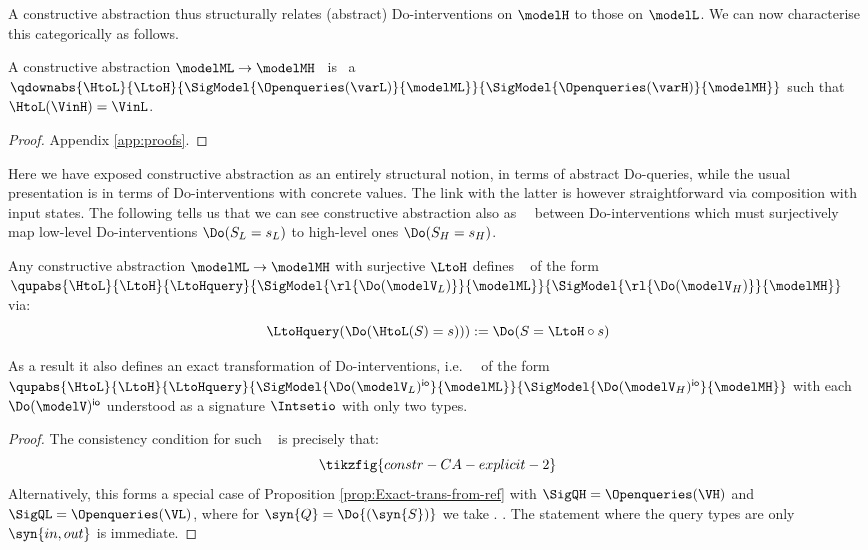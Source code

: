 \documentclass{article}
\begin{document}
A constructive abstraction thus structurally relates (abstract) Do-interventions on $\modelH$ to those on $\modelL$. We can now characterise this categorically as follows.


\begin{theorem} \label{Thm:CCA-as-refinement}
A constructive abstraction $\modelML \to \modelMH$ 
\ is \ 
a \qdown{} $\qdownabs{\HtoL}{\LtoH}{\SigModel{\Openqueries(\varL)}{\modelML}}{\SigModel{\Openqueries(\varH)}{\modelMH}}$ 
such that $\HtoL(\VinH) = \VinL$. 
\end{theorem}
\begin{proof}
Appendix \ref{app:proofs}.
\end{proof}

Here we have exposed constructive abstraction as an entirely structural notion, in terms of abstract Do-queries, while the usual presentation is in terms of Do-interventions with concrete values. The link with the latter is however  straightforward via composition with input states. 
The following tells us that we can see constructive abstraction also as \rlc{an}\ \qup\ between Do-interventions 
which must surjectively map low-level Do-interventions $\Do(S_L=s_L)$ to high-level ones $\Do(S_H=s_H)$.  


\begin{corollary} \label{cor:CCA-as-qup}
Any constructive abstraction 
$\modelML \to \modelMH$
with surjective $\LtoH$ 
defines \ \qup{}
of the form 
$\qupabs{\HtoL}{\LtoH}{\LtoHquery}{\SigModel{\rl{\Do(\modelV_L)}}{\modelML}}{\SigModel{\rl{\Do(\modelV_H)}}{\modelMH}}$ 
via: 
\[
\LtoHquery(\Do(\HtoL(S)=s))) := \Do(S=\LtoH \circ s) 
\]
\end{corollary}

As a result it also defines an exact transformation of Do-interventions, i.e.~\ \qup{} of the form 
${\qupabs{\HtoL}{\LtoH}{\LtoHquery}
{\SigModel{\Do(\modelV_L)^{\mathsf{io}}}{\modelML}}
{\SigModel{\Do(\modelV_H)^{\mathsf{io}}}{\modelMH}}}$ with each $\Do(\modelV)^{\mathsf{io}}$ understood as a signature $\Intsetio$ with only two types. 
\rlc{In fact it defines a \strongCA\ (Def.~\ref{def:strong-CA}).}\

\begin{proof}
The consistency condition for such \ \qup{} is precisely that: 
\begin{equation} \label{eq:constr-CA-explicit}
\tikzfig{constr-CA-explicit-2}
\end{equation}
Alternatively, this forms a special case of Proposition \ref{prop:Exact-trans-from-ref} with $\SigQH=\Openqueries(\VH)$ and $\SigQL=\Openqueries(\VL)$, where for $\syn{Q}=\Do{(\syn{S})}$ we take . 
. 
The statement where the query types are only $\syn{in,out}$ is immediate. 
\end{proof}
\end{document}
